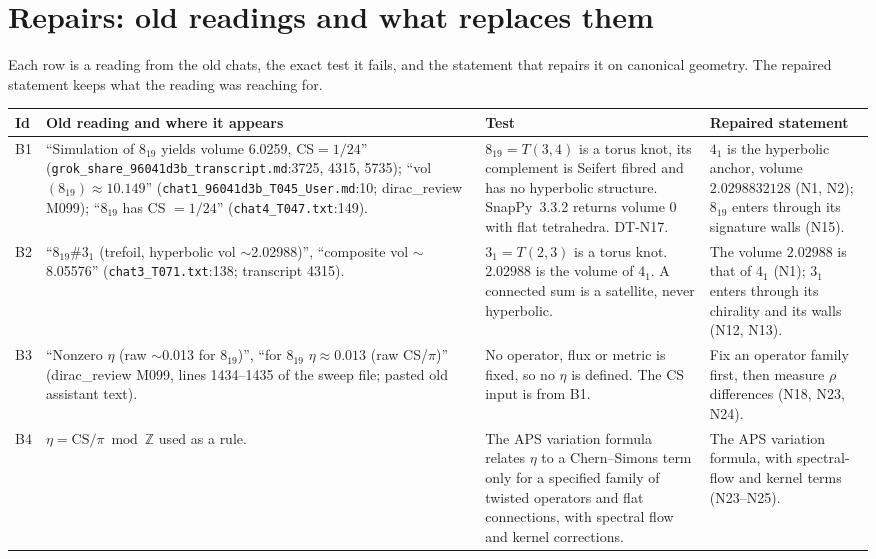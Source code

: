\documentclass[11pt]{article}
\theoremstyle{definition}
\begin{document}
\section{Repairs: old readings and what replaces them}\label{sec:breakers}
Each row is a reading from the old chats, the exact test it fails, and the statement that repairs it on canonical geometry. The repaired statement keeps what the reading was reaching for.
\begin{longtable}{@{}L{0.06\textwidth}L{0.34\textwidth}L{0.25\textwidth}L{0.25\textwidth}@{}}
\toprule
Id & Old reading and where it appears & Test & Repaired statement\\
\midrule\endhead
B1 & ``Simulation of $8_{19}$ yields volume 6.0259, CS$=1/24$'' (\texttt{grok\_\allowbreak{}share\_\allowbreak{}96041d3b\_\allowbreak{}transcript.md}:3725, 4315, 5735); ``vol$(8_{19})\approx10.149$'' (\texttt{chat1\_\allowbreak{}96041d3b\_\allowbreak{}T045\_\allowbreak{}User.md}:10; dirac\_\allowbreak{}review M099); ``$8_{19}$ has CS $=1/24$'' (\texttt{chat4\_\allowbreak{}T047.txt}:149). & $8_{19}=T(3,4)$ is a torus knot, its complement is Seifert fibred and has no hyperbolic structure. SnapPy~3.3.2 returns volume $0$ with flat tetrahedra. DT-N17. & $4_1$ is the hyperbolic anchor, volume $2.0298832128$ (N1, N2); $8_{19}$ enters through its signature walls (N15).\\
B2 & ``$8_{19}\#3_1$ (trefoil, hyperbolic vol $\sim$2.02988)'', ``composite vol $\sim$8.05576'' (\texttt{chat3\_\allowbreak{}T071.txt}:138; transcript 4315). & $3_1=T(2,3)$ is a torus knot. $2.02988$ is the volume of $4_1$. A connected sum is a satellite, never hyperbolic. & The volume $2.02988$ is that of $4_1$ (N1); $3_1$ enters through its chirality and its walls (N12, N13).\\
B3 & ``Nonzero $\eta$ (raw $\sim$0.013 for $8_{19}$)'', ``for $8_{19}$ $\eta\approx0.013$ (raw CS/$\pi$)'' (dirac\_\allowbreak{}review M099, lines 1434--1435 of the sweep file; pasted old assistant text). & No operator, flux or metric is fixed, so no $\eta$ is defined. The CS input is from B1. & Fix an operator family first, then measure $\rho$ differences (N18, N23, N24).\\
B4 & $\eta=\mathrm{CS}/\pi \bmod \mathbb Z$ used as a rule. & The APS variation formula relates $\eta$ to a Chern--Simons term only for a specified family of twisted operators and flat connections, with spectral flow and kernel corrections. & The APS variation formula, with spectral-flow and kernel terms (N23--N25).\\

\end{longtable}
\end{document}
